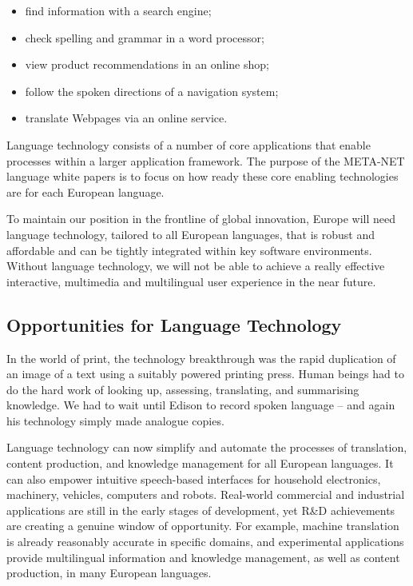 \begin{multicols}{2}
\begin{itemize}
\item find information with a search engine;
\item check spelling and grammar in a word processor;
\item view product recommendations in an online shop;
\item follow the spoken directions of a navigation system;
\item translate Webpages via an online service.
\end{itemize}

Language technology consists of a number of core applications that enable processes within a larger application framework. The purpose of the META-NET language white papers is to focus on how ready these core enabling technologies are for each European language. 


To maintain our position in the frontline of global innovation, Europe will need language technology, tailored to all European languages, that is robust and affordable and can be tightly integrated within key software environments. Without language technology, we will not be able to achieve a really effective interactive, multimedia and multilingual user experience in the near future.

\subsection{Opportunities for Language Technology}

In the world of print, the technology breakthrough was the rapid duplication of an image of a text using a suitably powered printing press. Human beings had to do the hard work of looking up, assessing, translating, and summarising knowledge. We had to wait until Edison to record spoken language – and again his technology simply made analogue copies.

Language technology can now simplify and automate the processes of translation, content production, and knowledge management for all European languages. It can also empower intuitive speech-based interfaces for household electronics, machinery, vehicles, computers and robots. Real-world commercial and industrial applications are still in the early stages of development, yet R\&D achievements are creating a genuine window of opportunity. For example, machine translation is already reasonably accurate in specific domains, and experimental applications provide multilingual information and knowledge management, as well as content production, in many European languages. 


\end{multicols}
